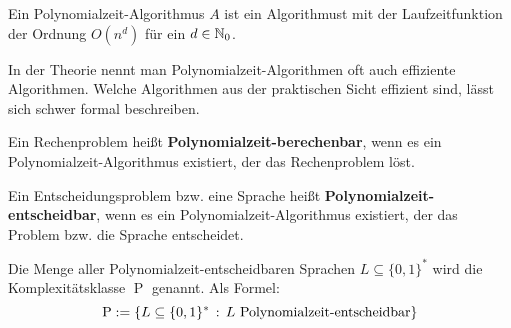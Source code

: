 \begin{bem}
	Ein Polynomialzeit-Algorithmus $A$ ist ein Algorithmust mit der Laufzeitfunktion der Ordnung $ O(n^d)$ für ein $d \in \mathbb{N}_0$. 
\end{bem} 

\begin{bem}
	In der Theorie nennt man Polynomialzeit-Algorithmen oft auch effiziente Algorithmen. Welche Algorithmen aus der praktischen Sicht effizient sind, lässt sich schwer formal beschreiben.
\end{bem} 

\begin{defn}
	Ein Rechenproblem heißt \textbf{Polynomialzeit-berechenbar}, wenn es ein Polynomialzeit-Algorithmus existiert, der das Rechenproblem löst. 
	
	Ein Entscheidungsproblem bzw. eine Sprache heißt \textbf{Polynomialzeit-\-ent\-scheid\-bar}, wenn es ein Polynomialzeit-Algorithmus existiert, der das Problem bzw. die Sprache entscheidet. 
\end{defn} 

\begin{defn}
	Die Menge aller Polynomialzeit-entscheidbaren Sprachen $L \subseteq \{0,1\}^\ast$ wird die Komplexitätsklasse $\operatorname{P}$ genannt. Als Formel: 
	\[
			\operatorname{P}:= \setcond{L \subseteq \{0,1\}^\ast }{L \ \text{Polynomialzeit-entscheidbar} } 
	\]
\end{defn} 

